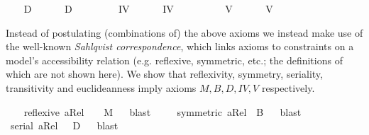 \begin{isabellebody}
\ \ \isamarkupfalse%
\ D\ \isanewline
\ \ \ \ \ {\isachardoublequoteopen}D\ {\isasymequiv}\ \isactrlbold {\isasymforall}{\isasymphi}{\isachardot}\ \isactrlbold {\isasymbox}{\isasymphi}\ \isactrlbold {\isasymrightarrow}\ \isactrlbold {\isasymdiamond}{\isasymphi}{\isachardoublequoteclose}\isanewline
\ \ \isamarkupfalse%
\ IV\ \isanewline
\ \ \ \ \ {\isachardoublequoteopen}IV\ {\isasymequiv}\ \isactrlbold {\isasymforall}{\isasymphi}{\isachardot}\ \isactrlbold {\isasymbox}{\isasymphi}\ \isactrlbold {\isasymrightarrow}\ \ \isactrlbold {\isasymbox}\isactrlbold {\isasymbox}{\isasymphi}{\isachardoublequoteclose}\isanewline
\ \ \isamarkupfalse%
\ V\ \isanewline
\ \ \ \ \ {\isachardoublequoteopen}V\ {\isasymequiv}\ \isactrlbold {\isasymforall}{\isasymphi}{\isachardot}\ \isactrlbold {\isasymdiamond}{\isasymphi}\ \isactrlbold {\isasymrightarrow}\ \isactrlbold {\isasymbox}\isactrlbold {\isasymdiamond}{\isasymphi}{\isachardoublequoteclose}%
\begin{isamarkuptext}%
Instead of postulating (combinations of) the above  axioms we instead make use of 
  the well-known \emph{Sahlqvist correspondence}, which links axioms to constraints on a model's accessibility
  relation (e.g. reflexive, symmetric, etc.; the definitions of which are not shown here). We show
  that  reflexivity, symmetry, seriality, transitivity and euclideanness imply
  axioms $M, B, D, IV, V$ respectively.%
\end{isamarkuptext}\isamarkuptrue%
\ \ \isamarkupfalse%
\ {\isachardoublequoteopen}reflexive\ aRel\ \ {\isasymLongrightarrow}\ \ {\isasymlfloor}M{\isasymrfloor}{\isachardoublequoteclose}%
\isadelimproof
\ %
\endisadelimproof
%
\isatagproof
{}\isamarkupfalse%
\ blast\ %
%
\endisatagproof
{\isafoldproof}%
%
\isadelimproof
%
\endisadelimproof
\isanewline
\ \ \isamarkupfalse%
\ {\isachardoublequoteopen}symmetric\ aRel\ {\isasymLongrightarrow}\ {\isasymlfloor}B{\isasymrfloor}{\isachardoublequoteclose}%
\isadelimproof
\ %
\endisadelimproof
%
\isatagproof
{}\isamarkupfalse%
\ blast%
\endisatagproof
{\isafoldproof}%
%
\isadelimproof
%
\endisadelimproof
\isanewline
\ \ \isamarkupfalse%
\ {\isachardoublequoteopen}serial\ aRel\ \ {\isasymLongrightarrow}\ {\isasymlfloor}D{\isasymrfloor}{\isachardoublequoteclose}%
\isadelimproof
\ %
\endisadelimproof
%
\isatagproof
{}\isamarkupfalse%
\ blast%
\endisatagproof

\end{isabellebody}
